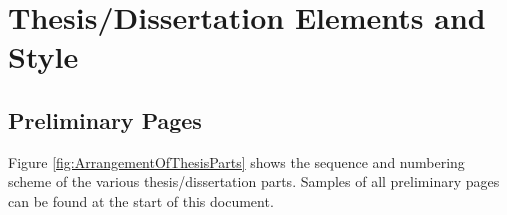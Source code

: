 \chapter{Thesis/Dissertation Elements and Style}
\label{chap:Thesis/DissertationElementsAndStyle}

\section{Preliminary Pages}
\label{sec:PreliminaryPages}

Figure \ref{fig:ArrangementOfThesisParts} shows the sequence and
numbering scheme of the various the\-sis/dis\-ser\-ta\-tion parts.
Samples of all preliminary pages can be found at the start of this
document.
\begin{figure}[tbp]
  \centering

\end{figure}
